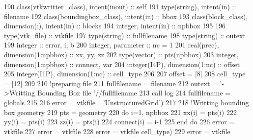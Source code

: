 \begin{DoxyCode}
190     \textcolor{keywordtype}{class}(vtkwritter\_class), \textcolor{keywordtype}{intent(inout)} :: self
191     \textcolor{keywordtype}{type}(string), \textcolor{keywordtype}{intent(in)} :: filename
192     \textcolor{keywordtype}{class}(boundingbox\_class), \textcolor{keywordtype}{intent(in)} :: bbox
193     \textcolor{keywordtype}{class}(block\_class), \textcolor{keywordtype}{dimension(:)}, \textcolor{keywordtype}{intent(in)} :: blocks
194     \textcolor{keywordtype}{integer}, \textcolor{keywordtype}{intent(in)} :: npbbox
195 
196     \textcolor{keywordtype}{type}(vtk\_file) :: vtkfile
197     \textcolor{keywordtype}{type}(string) :: fullfilename
198     \textcolor{keywordtype}{type}(string) :: outext
199     \textcolor{keywordtype}{integer} :: error, i, b
200     \textcolor{keywordtype}{integer}, \textcolor{keywordtype}{parameter} :: nc = 1
201     \textcolor{keywordtype}{real(prec)}, \textcolor{keywordtype}{dimension(1:npbbox)} :: xx, yy, zz
202     \textcolor{keywordtype}{type}(vector) :: pts(npbbox)
203     \textcolor{keywordtype}{integer}, \textcolor{keywordtype}{dimension(1:npbbox)} :: connect, var
204     \textcolor{keywordtype}{integer(I4P)}, \textcolor{keywordtype}{dimension(1:nc)} :: offset
205     \textcolor{keywordtype}{integer(I1P)}, \textcolor{keywordtype}{dimension(1:nc)} :: cell\_type
206 
207     offset = [8]
208     cell\_type = [12]
209 
210     \textcolor{comment}{!preparing file}
211     fullfilename = filename%
212     outext = \textcolor{stringliteral}{'->Writting Bounding Box file '}//fullfilename
213     \textcolor{keyword}{call }log%
214     fullfilename = globals%
215 
216     error = vtkfile%
      =\textcolor{stringliteral}{'UnstructuredGrid'})
217 
218     \textcolor{comment}{!Writting bounding box geometry}
219     pts = geometry%
220     \textcolor{keywordflow}{do} i=1, npbbox
221         xx(i) = pts(i)%
222         yy(i) = pts(i)%
223         zz(i) = pts(i)%
224         connect(i) = i-1
225 \textcolor{keywordflow}{    end do}
226     error = vtkfile%
227     error = vtkfile%
228     error = vtkfile%
      cell\_type)
229     error = vtkfile%

\end{DoxyCode}

